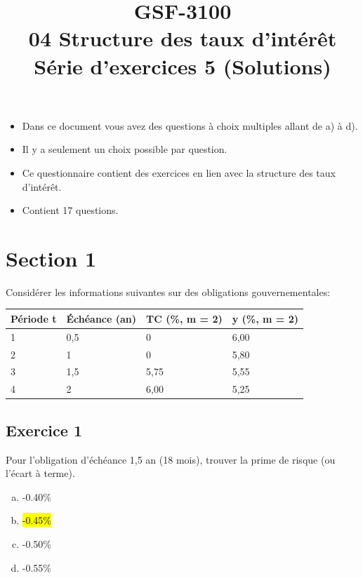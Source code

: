 \documentclass[10pt,a4paper]{article}
\title{GSF-3100 \\
04 Structure des taux d'intérêt \\
Série d'exercices 5 (Solutions)}
\begin{document}
\maketitle

\begin{itemize}
\item Dans ce document vous avez des questions à choix multiples allant de a) à d).  
\item Il y a seulement un choix possible par question.
\item Ce questionnaire contient des exercices en lien avec la structure des taux d'intérêt.
\item Contient 17 questions. 
\end{itemize}
 
\newpage

\section*{Section 1}
Considérer les informations suivantes sur des obligations gouvernementales:


\begin{table}[H]
\begin{center}
\begin{tabular}{|l|l|l|l|}
\hline
Période t & Échéance (an) & TC (\%, m = 2) & y (\%, m = 2) \\ \hline
1         & 0,5           & 0              & 6,00          \\ \hline
2         & 1             & 0              & 5,80          \\ \hline
3         & 1,5           & 5,75           & 5,55          \\ \hline
4         & 2             & 6,00           & 5,25          \\ \hline
\end{tabular}
\end{center}
\end{table}



\subsection*{Exercice 1}
Pour l'obligation d'échéance 1,5 an (18 mois),  trouver la prime de risque (ou l’écart à terme).


\begin{enumerate}[a)]
\item -0.40\%
\item  \hl{-0.45\%}
\item -0.50\%
\item -0.55\%
\end{enumerate}
\end{document}
